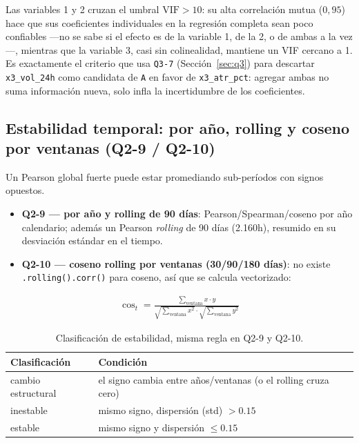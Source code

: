\documentclass[11pt,a4paper]{article}
\newcommand{\code}[1]{\texttt{\small #1}}
\begin{document}
Las variables 1 y 2 cruzan el umbral \(\mathrm{VIF}>10\): su alta correlación mutua
(\(0{,}95\)) hace que sus coeficientes individuales en la regresión completa sean poco
confiables —no se sabe si el efecto es de la variable 1, de la 2, o de ambas a la vez—,
mientras que la variable 3, casi sin colinealidad, mantiene un VIF cercano a 1. Es
exactamente el criterio que usa \code{Q3-7} (Sección~\ref{sec:q3}) para descartar
\code{x3\_vol\_24h} como candidata de \code{A} en favor de \code{x3\_atr\_pct}: agregar
ambas no suma información nueva, solo infla la incertidumbre de los coeficientes.

\subsection{Estabilidad temporal: por año, rolling y coseno por ventanas (Q2-9 / Q2-10)}

Un Pearson global fuerte puede estar promediando sub-períodos con signos opuestos.

\begin{itemize}[leftmargin=1.4em,itemsep=2pt]
\item \textbf{Q2-9 — por año y rolling de 90 días}: Pearson/Spearman/coseno por año
  calendario; además un Pearson \emph{rolling} de 90 días (2.160h), resumido en su
  desviación estándar en el tiempo.
\item \textbf{Q2-10 — coseno rolling por ventanas (30/90/180 días)}: no existe
  \code{.rolling().corr()} para coseno, así que se calcula vectorizado:
\end{itemize}

\begin{align}
\cos_t = \frac{\sum_{\text{ventana}} x\cdot y}{\sqrt{\sum_{\text{ventana}} x^2} \cdot
  \sqrt{\sum_{\text{ventana}} y^2}}
\end{align}

\begin{table}[h]
\centering
\small
\begin{tabular}{@{}l l@{}}
\toprule
\textbf{Clasificación} & \textbf{Condición} \\
\midrule
cambio estructural & el signo cambia entre años/ventanas (o el rolling cruza cero) \\
inestable & mismo signo, dispersión (std) \(> 0.15\) \\
estable & mismo signo y dispersión \(\leq 0.15\) \\
\bottomrule
\end{tabular}
\caption{Clasificación de estabilidad, misma regla en Q2-9 y Q2-10.}
\end{table}
\end{document}

